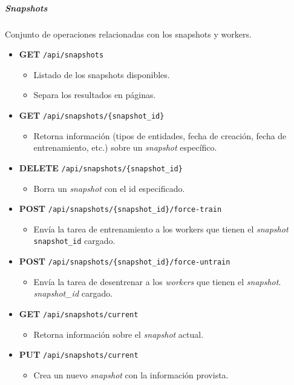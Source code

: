 \documentclass[12pt,a4paper,]{scrartcl}
\providecommand{\tightlist}{%
  \setlength{\itemsep}{0pt}\setlength{\parskip}{0pt}}
\let\oldsubparagraph\subparagraph
\renewcommand{\subparagraph}[1]{\oldsubparagraph{#1}\mbox{}}
\begin{document}
\hypertarget{snapshots-1}{%
\subparagraph{Snapshots}\label{snapshots-1}}

Conjunto de operaciones relacionadas con los snapshots y workers.

\begin{itemize}
\tightlist
\item
  \textbf{GET} \texttt{/api/snapshots}

  \begin{itemize}
  \tightlist
  \item
    Listado de los snapshots disponibles.
  \item
    Separa los resultados en páginas.
  \end{itemize}
\item
  \textbf{GET} \texttt{/api/snapshots/\{snapshot\_id\}}

  \begin{itemize}
  \tightlist
  \item
    Retorna información (tipos de entidades, fecha de creación, fecha de entrenamiento, etc.) sobre un \emph{snapshot} específico.
  \end{itemize}
\item
  \textbf{DELETE} \texttt{/api/snapshots/\{snapshot\_id\}}

  \begin{itemize}
  \tightlist
  \item
    Borra un \emph{snapshot} con el id especificado.
  \end{itemize}
\item
  \textbf{POST} \texttt{/api/snapshots/\{snapshot\_id\}/force-train}

  \begin{itemize}
  \tightlist
  \item
    Envía la tarea de entrenamiento a los workers que tienen el \emph{snapshot} \texttt{snapshot\_id} cargado.
  \end{itemize}
\item
  \textbf{POST} \texttt{/api/snapshots/\{snapshot\_id\}/force-untrain}

  \begin{itemize}
  \tightlist
  \item
    Envía la tarea de desentrenar a los \emph{workers} que tienen el \emph{snapshot}. \emph{snapshot\_id} cargado.
  \end{itemize}
\item
  \textbf{GET} \texttt{/api/snapshots/current}

  \begin{itemize}
  \tightlist
  \item
    Retorna información sobre el \emph{snapshot} actual.
  \end{itemize}
\item
  \textbf{PUT} \texttt{/api/snapshots/current}

  \begin{itemize}
  \tightlist
  \item
    Crea un nuevo \emph{snapshot} con la información provista.
  \end{itemize}
\end{itemize}
\end{document}
